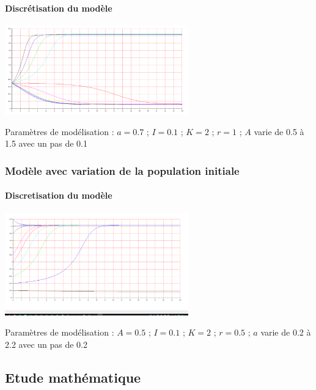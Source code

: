 \documentclass{article}
\begin{document}
\paragraph{Discrétisation du modèle}
\begin{center}
\includegraphics[width=300px]{img/part1/TrajA.png}
\end{center}
Paramètres de modélisation : $a=0.7$ ; $I=0.1$ ; $K=2$ ; $r=1$  ; $A$ varie de 0.5 à 1.5 avec un pas de 0.1
\paragraph{}

\subsubsection{Modèle avec variation de la population initiale}

\paragraph{Discretisation du modèle}
\begin{center}
\includegraphics[width=300px]{img/part1/TrajPop.png}
\end{center}
Paramètres de modélisation : $A=0.5$ ; $I=0.1$ ; $K=2$ ; $r=0.5$  ; $a$ varie de 0.2 à 2.2 avec un pas de 0.2
\paragraph{}

\newpage

\subsection{Etude mathématique}
\end{document}
